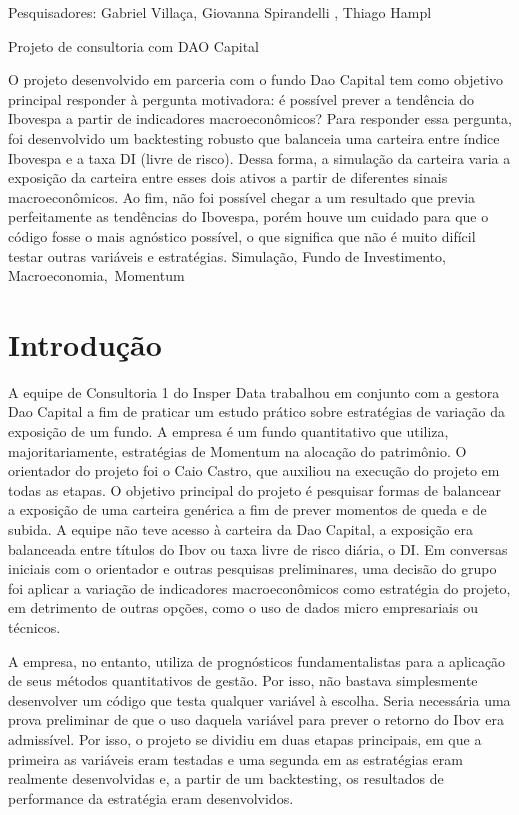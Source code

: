     {
        \noindent Pesquisadores: Gabriel Villaça, Giovanna Spirandelli , Thiago Hampl

        \noindent Projeto de consultoria com DAO Capital
    }
    {O projeto desenvolvido em parceria com o fundo Dao Capital tem como objetivo principal responder à pergunta motivadora: é possível prever a tendência do Ibovespa a partir de indicadores macroeconômicos? Para responder essa pergunta, foi desenvolvido um backtesting robusto que balanceia uma carteira entre índice Ibovespa e a taxa DI (livre de risco). Dessa forma, a simulação da carteira varia a exposição da carteira entre esses dois ativos a partir de diferentes sinais macroeconômicos. Ao fim, não foi possível chegar a um resultado que previa perfeitamente as tendências do Ibovespa, porém houve um cuidado para que o código fosse o mais agnóstico possível, o que significa que não é muito difícil testar outras variáveis e estratégias. 
    }
    {Simulação, Fundo de Investimento, Macroeconomia, Momentum}
    
\section{Introdução}

A equipe de Consultoria 1 do Insper Data trabalhou em conjunto com a gestora Dao Capital a fim de praticar um estudo prático sobre estratégias de variação da exposição de um fundo. A empresa é um fundo quantitativo que utiliza, majoritariamente, estratégias de Momentum na alocação do patrimônio. O orientador do projeto foi o Caio Castro, que auxiliou na execução do projeto em todas as etapas.
O objetivo principal do projeto é pesquisar formas de balancear a exposição de uma carteira genérica a fim de prever momentos de queda e de subida. A equipe não teve acesso à carteira da Dao Capital, a exposição era balanceada entre títulos do Ibov ou taxa livre de risco diária, o DI. Em conversas iniciais com o orientador e outras pesquisas preliminares, uma decisão do grupo foi aplicar a variação de indicadores macroeconômicos como estratégia do projeto, em detrimento de outras opções, como o uso de dados micro empresariais ou técnicos.

A empresa, no entanto, utiliza de prognósticos fundamentalistas para a aplicação de seus métodos quantitativos de gestão. Por isso, não bastava simplesmente desenvolver um código que testa qualquer variável à escolha. Seria necessária uma prova preliminar de que o uso daquela variável para prever o retorno do Ibov era admissível. Por isso, o projeto se dividiu em duas etapas principais, em que a primeira as variáveis eram testadas e uma segunda em as estratégias eram realmente desenvolvidas e, a partir de um backtesting, os resultados de performance da estratégia eram desenvolvidos. 

